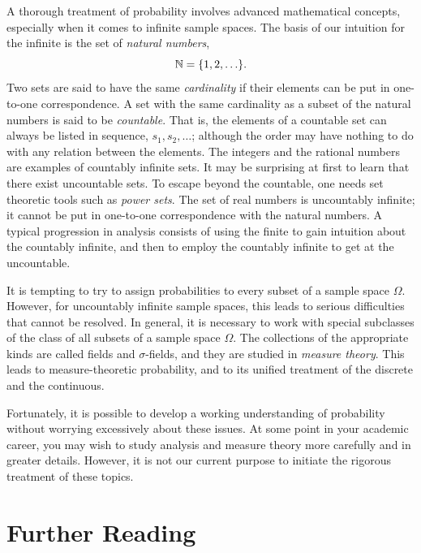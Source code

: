 A thorough treatment of probability involves advanced mathematical concepts, especially when it comes to infinite sample spaces.
The basis of our intuition for the infinite is the set of \emph{natural numbers},
\begin{equation*}
\mathbb{N} = \{ 1, 2, \ldots \}.
\end{equation*}
Two sets are said to have the same \emph{cardinality} if their elements can be put in one-to-one correspondence.
A set with the same cardinality as a subset of the natural numbers is said to be \emph{countable}.
That is, the elements of a countable set can always be listed in sequence, $s_1, s_2, \ldots$; although the order may have nothing to do with any relation between the elements.
The integers and the rational numbers are examples of countably infinite sets.
It may be surprising at first to learn that there exist uncountable sets.
To escape beyond the countable, one needs set theoretic tools such as \emph{power sets}.
The set of real numbers is uncountably infinite; it cannot be put in one-to-one correspondence with the natural numbers.
A typical progression in analysis consists of using the finite to gain intuition about the countably infinite, and then to employ the countably infinite to get at the uncountable.

It is tempting to try to assign probabilities to every subset of a sample space $\Omega$.
However, for uncountably infinite sample spaces, this leads to serious difficulties that cannot be resolved.
In general, it is necessary to work with special subclasses of the class of all subsets of a sample space $\Omega$.
The collections of the appropriate kinds are called fields and $\sigma$-fields, and they are studied in \emph{measure theory}.
This leads to measure-theoretic probability, and to its unified treatment of the discrete and the continuous.

Fortunately, it is possible to develop a working understanding of probability without worrying excessively about these issues.
At some point in your academic career, you may wish to study analysis and measure theory more carefully and in greater details.
However, it is not our current purpose to initiate the rigorous treatment of these topics.


\section*{Further Reading}

